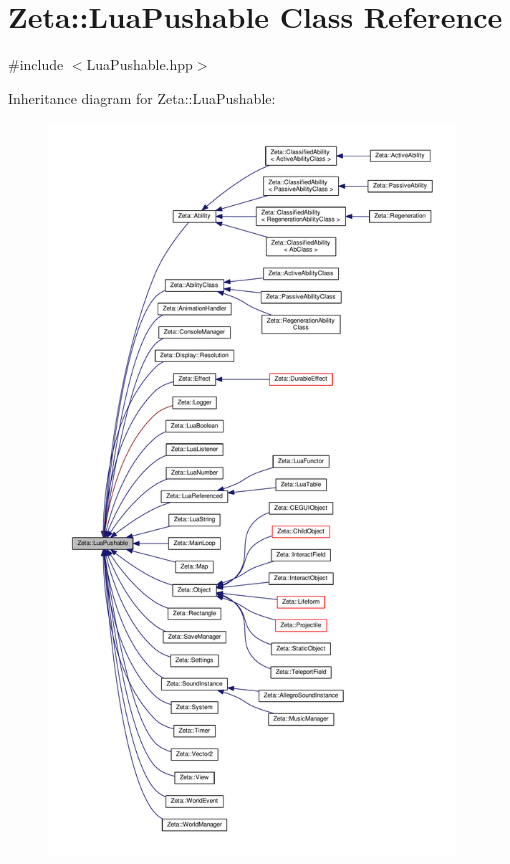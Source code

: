 \hypertarget{classZeta_1_1LuaPushable}{\section{Zeta\+:\+:Lua\+Pushable Class Reference}
\label{classZeta_1_1LuaPushable}
}


{\ttfamily \#include $<$Lua\+Pushable.\+hpp$>$}



Inheritance diagram for Zeta\+:\+:Lua\+Pushable\+:\nopagebreak
\begin{figure}[H]
\begin{center}
\leavevmode
\includegraphics[height=550pt]{classZeta_1_1LuaPushable__inherit__graph}
\end{center}
\end{figure}
